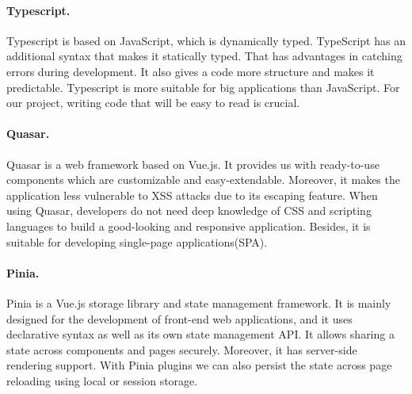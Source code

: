 \paragraph*{Typescript.} Typescript is based on JavaScript, which is dynamically typed. TypeScript has an additional syntax that makes it statically typed. That has advantages in catching errors during development. It also gives a code more structure and makes it predictable. Typescript is more suitable for big applications than JavaScript. For our project, writing code that will be easy to read is crucial. \cite{typescript-doc}

\paragraph*{Quasar.} Quasar is a web framework based on Vue.js. It provides us with ready-to-use components which are customizable and easy-extendable. Moreover, it makes the application less vulnerable to XSS attacks due to its escaping feature. When using Quasar, developers do not need deep knowledge of CSS and scripting languages to build a good-looking  and responsive application. Besides, it is suitable for developing single-page applications(SPA). \cite{quasar-doc}

\paragraph*{Pinia.} Pinia is a Vue.js storage library and state management framework. It is mainly designed for the development of front-end web applications, and it uses declarative syntax as well as its own state management API.
It allows sharing a state across components and pages securely. Moreover, it has server-side rendering support. With Pinia plugins we can also persist the state across page reloading using local or session storage. \cite{pinia-wiki}

